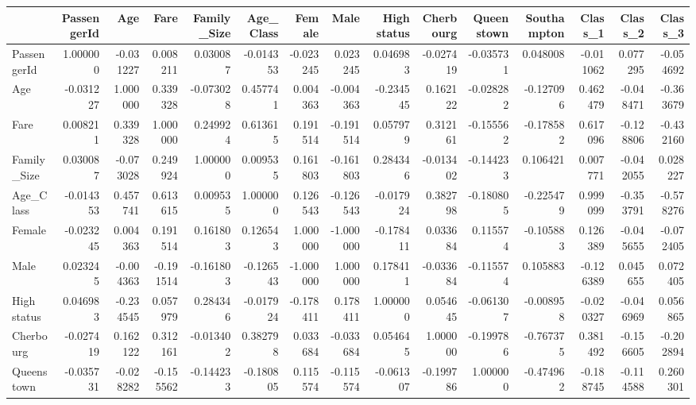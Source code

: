 \begin{tabular}{lrrrrrrrrrrrrrr}
\toprule
{} &  PassengerId &       Age &      Fare &  Family\_Size &  Age\_Class &    Female &      Male &  High status &  Cherbourg &  Queenstown &  Southampton &   Class\_1 &   Class\_2 &   Class\_3 \\
\midrule
PassengerId &     1.000000 & -0.031227 &  0.008211 &     0.030087 &  -0.014353 & -0.023245 &  0.023245 &     0.046983 &  -0.027419 &   -0.035731 &     0.048008 & -0.011062 &  0.077295 & -0.054692 \\
Age         &    -0.031227 &  1.000000 &  0.339328 &    -0.073028 &   0.457741 &  0.004363 & -0.004363 &    -0.234545 &   0.162122 &   -0.028282 &    -0.127096 &  0.462479 & -0.048471 & -0.363679 \\
Fare        &     0.008211 &  0.339328 &  1.000000 &     0.249924 &   0.613615 &  0.191514 & -0.191514 &     0.057979 &   0.312161 &   -0.155562 &    -0.178582 &  0.617096 & -0.128806 & -0.432160 \\
Family\_Size &     0.030087 & -0.073028 &  0.249924 &     1.000000 &   0.009535 &  0.161803 & -0.161803 &     0.284346 &  -0.013402 &   -0.144233 &     0.106421 &  0.007771 & -0.042055 &  0.028227 \\
Age\_Class   &    -0.014353 &  0.457741 &  0.613615 &     0.009535 &   1.000000 &  0.126543 & -0.126543 &    -0.017924 &   0.382798 &   -0.180805 &    -0.225479 &  0.999099 & -0.353791 & -0.578276 \\
Female      &    -0.023245 &  0.004363 &  0.191514 &     0.161803 &   0.126543 &  1.000000 & -1.000000 &    -0.178411 &   0.033684 &    0.115574 &    -0.105883 &  0.126389 & -0.045655 & -0.072405 \\
Male        &     0.023245 & -0.004363 & -0.191514 &    -0.161803 &  -0.126543 & -1.000000 &  1.000000 &     0.178411 &  -0.033684 &   -0.115574 &     0.105883 & -0.126389 &  0.045655 &  0.072405 \\
High status &     0.046983 & -0.234545 &  0.057979 &     0.284346 &  -0.017924 & -0.178411 &  0.178411 &     1.000000 &   0.054645 &   -0.061307 &    -0.008958 & -0.020327 & -0.046969 &  0.056865 \\
Cherbourg   &    -0.027419 &  0.162122 &  0.312161 &    -0.013402 &   0.382798 &  0.033684 & -0.033684 &     0.054645 &   1.000000 &   -0.199786 &    -0.767375 &  0.381492 & -0.156605 & -0.202894 \\
Queenstown  &    -0.035731 & -0.028282 & -0.155562 &    -0.144233 &  -0.180805 &  0.115574 & -0.115574 &    -0.061307 &  -0.199786 &    1.000000 &    -0.474962 & -0.188745 & -0.114588 &  0.260301 \\

\end{tabular}
